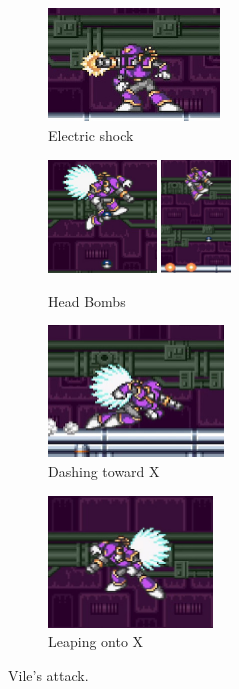 \begin{figure}[htp]
	\centering
	\begin{subfigure}[t]{0.4\linewidth}
		\centering
		\includegraphics[height=3cm]{figures/X1/Sigma_stages/Vile_cannon_1.jpg}
		\caption{Electric shock}
	\end{subfigure}
	\begin{subfigure}[t]{0.5\linewidth}
		\centering
		\includegraphics[height=3cm]{figures/X1/Sigma_stages/Vile_bomb_1.jpg}
		\includegraphics[height=3cm]{figures/X1/Sigma_stages/Vile_bomb_2.jpg}
		\caption{Head Bombs}
	\end{subfigure}
	\begin{subfigure}[t]{0.4\linewidth}
		\centering
		\includegraphics[height=3.5cm]{figures/X1/Sigma_stages/Vile_dash.jpg}
		\caption{Dashing toward X}
	\end{subfigure}
	\begin{subfigure}[t]{0.4\linewidth}
		\centering
		\includegraphics[height=3.5cm]{figures/X1/Sigma_stages/Vile_leap.jpg}
		\caption{Leaping onto X}
	\end{subfigure}
	\caption{Vile's attack.}
\end{figure} 
